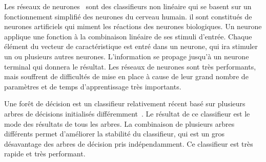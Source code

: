 Les réseaux de neurones~\cite{haykin1999neural} sont des classifieurs non linéaire qui se basent sur un fonctionnement simplifié des neurones du cerveau humain. il sont constitués de neurones artificiels qui miment les réactions des neurones biologiques. Un neurone applique une fonction à la combinaison linéaire de ses stimuli d'entrée. Chaque élément du vecteur de caractéristique est entré dans un neurone, qui ira stimuler un ou plusieurs autres neurones. L'information se propage jusqu'à un neurone terminal qui donnera le résultat. Les réseaux de neurones sont très performants, mais souffrent de difficultés de mise en place à cause de leur grand nombre de paramètres et de temps d'apprentissage très importants.

Une forêt de décision est un classifieur relativement récent basé sur plusieurs arbres de décisions initialisés différemment~\cite{ho1998random}. Le résultat de ce classifieur est le mode des résultats de tous les arbres. La combinaison de plusieurs arbres différents permet d'améliorer la stabilité du classifieur, qui est un gros désavantage des arbres de décision pris indépendamment. Ce classifieur est très rapide et très performant.

